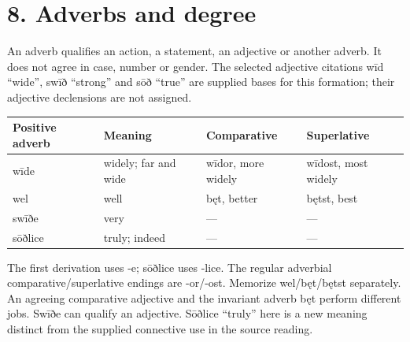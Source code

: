 \section*{8. Adverbs and degree}

An adverb qualifies an action, a statement, an adjective or another adverb. It does not agree in case, number or gender. The selected adjective citations wīd “wide”, swīð “strong” and sōð “true” are supplied bases for this formation; their adjective declensions are not assigned.

\par\begingroup
\fontsize{10.5}{13.2}\selectfont
\setlength{\LTleft}{0pt}\setlength{\LTright}{\fill}
\noindent
\begin{tabular}{@{}>{\raggedright\arraybackslash}p{24.43mm}>{\raggedright\arraybackslash}p{28.15mm}>{\raggedright\arraybackslash}p{31.0mm}>{\raggedright\arraybackslash}p{31.99mm}@{}}
\toprule
\textbf{Positive adverb} & \textbf{Meaning} & \textbf{Comparative} & \textbf{Superlative} \\
\midrule
wīde & widely; far and wide & wīdor, more widely & wīdost, most widely \\
wel & well & bęt, better & bętst, best \\
swīðe & very & — & — \\
sōðlice & truly; indeed & — & — \\
\bottomrule
\end{tabular}
\par\endgroup

The first derivation uses -e; sōðlice uses -lice. The regular adverbial comparative/\allowbreak{}superlative endings are -or/\allowbreak{}-ost. Memorize wel/\allowbreak{}bęt/\allowbreak{}bętst separately. An agreeing comparative adjective and the invariant adverb bęt perform different jobs. Swīðe can qualify an adjective. Sōðlice “truly” here is a new meaning distinct from the supplied connective use in the source reading.

